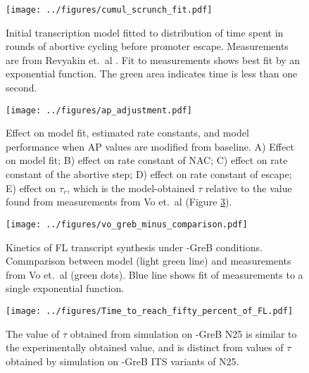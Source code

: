 \begin{figure}
    \begin{center}
      \texttt{[image: ../figures/cumul\_scrunch\_fit.pdf]}
    \end{center}
    \caption{Initial transcription model fitted to distribution of time spent
      in rounds of abortive cycling before promoter escape. Measurements are
      from Revyakin et.\ al \cite{revyakin_abortive_2006}. Fit to measurements
      shows best fit by an exponential function. The green area indicates time
      is less than one second.}
\label{fig:revyakin_fit}
\end{figure}


\begin{figure}
    \begin{center}
      \texttt{[image: ../figures/ap\_adjustment.pdf]}
    \end{center}
    \caption{Effect on model fit, estimated rate constants, and model
      performance when AP values are modified from baseline. A) Effect on
      model fit; B) effect on rate constant of NAC; C) effect on rate constant of
      the abortive step; D) effect on rate constant of escape; E) effect on
      $\tau_r$, which is the model-obtained $\tau$ relative to the value found from
      measurements from Vo et.\ al \cite{vo_vitro_2003-1} (Figure
      \ref{fig:vo_comparison}).}
\label{fig:ap_adjustment}
\end{figure}


\begin{figure}
    \begin{center}
        \texttt{[image: ../figures/vo\_greb\_minus\_comparison.pdf]}
    \end{center}
    \caption{Kinetics of FL transcript synthesis under -GreB conditions.
      Commparison between model (light green line) and measurements from Vo
      et.\ al \cite{vo_vitro_2003-1} (green dots). Blue line shows fit of
      measurements to a single exponential function.}
\label{fig:vo_comparison}
\end{figure}


\begin{figure}
    \begin{center}
      \texttt{[image: ../figures/Time\_to\_reach\_fifty\_percent\_of\_FL.pdf]}
    \end{center}
    \caption{The value of $\tau$ obtained from simulation on -GreB N25 is
      similar to the experimentally obtained value, and is distinct from
      values of $\tau$ obtained by simulation on -GreB ITS variants of N25.}
\label{fig:its_variant_fl_comparison}
\end{figure}

